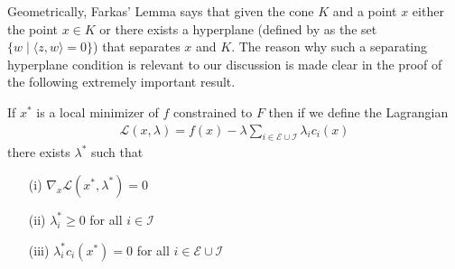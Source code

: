 Geometrically, Farkas' Lemma says that given the cone $K$ and a point $x$ either the point $x \in K$ or there exists a 
hyperplane (defined by as the set $\lbrace w \mid \langle z,w \rangle = 0 \rbrace$) that separates $x$ and $K$.
The reason why such a separating hyperplane condition is relevant to our discussion is made clear in the proof of the following
extremely important result. 

\begin{thm}\label{KKTFiniteDimensions}If $x^*$ is a local minimizer of $f$ constrained to $F$ then if we define
the Lagrangian 
\begin{align*}
\mathcal{L}(x, \lambda) = f(x) - \lambda \sum_{i \in \mathcal{E} \cup \mathcal{I}} \lambda_i c_i(x)
\end{align*}
there exists $\lambda^*$ such that
\begin{itemize}
\item[(i)]$\nabla_x \mathcal{L}(x^*, \lambda^*) = 0$
\item[(ii)]$\lambda_i^* \geq 0$ for all $i \in \mathcal{I}$
\item[(iii)]$\lambda_i^* c_i(x^*) = 0$ for all $i \in \mathcal{E} \cup \mathcal{I}$
\end{itemize}
\end{thm}
